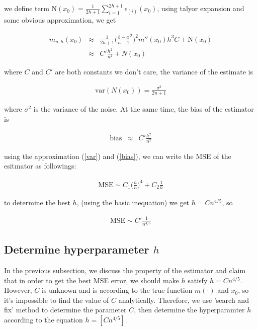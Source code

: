 \documentclass[twoside]{article}
\begin{document}
we define term $\mathrm{N}(x_0)=\frac{1}{2h+1}\sum_{i=1}^{2h+1}{\epsilon_{(i)}(x_0)}$, using talyor expansion and some obvious approximation, we get

\begin{eqnarray}
  \hat{m}_{n,h}(x_0)&\approx&\frac{1}{2h+1}\big(\frac{b-a}{n-1}^2\big)^2m''(x_0)h^3C+\mathrm{N}(x_0) \nonumber \\
  &\approx&C'\frac{h^2}{n^2}+N(x_0)
\end{eqnarray} 

where $C$ and $C'$ are both constants we don't care, the variance of the estimate is

\begin{eqnarray}
\label{var}
  \mathrm{var}(N(x_0))=\frac{\sigma^2}{2n+1}
\end{eqnarray}

where $\sigma^2$ is the variance of the noise. At the same time, the bias of the estimator is 

\begin{eqnarray}
\label{bias}
  \mathrm{bias}&\approx&C'\frac{h^2}{n^2}
\end{eqnarray}

using the approximation (\ref{var}) and (\ref{bias}), we can write the MSE of the esitmator as followings:

\begin{eqnarray}
\label{mse}
  \mathrm{MSE} \sim C_1\big(\frac{h}{n}\big)^4+C_2\frac{1}{h}
\end{eqnarray}

to determine the best $h$, (using the basic inequation) we get $h=Cn^{4/5}$, so

\begin{eqnarray}
\label{msef}
  \mathrm{MSE} \sim C'\frac{1}{n^{4/5}}
\end{eqnarray}

\subsection{Determine hyperparameter $h$}

In the previous subsection, we discuss the property of the estimator and claim that in order to get the best MSE error, we should make $h$ satisfy $h=Cn^{4/5}$. However, $C$ is unknown and is according to the true function $m(\cdot)$ and $x_0$, so it's impossible to find the value of $C$ analytically. Therefore, we use 'search and fix' method to determine the parameter $C$, then determine the hyperparamter $h$ according to the equation $h=[Cn^{4/5}]$.
\end{document}
